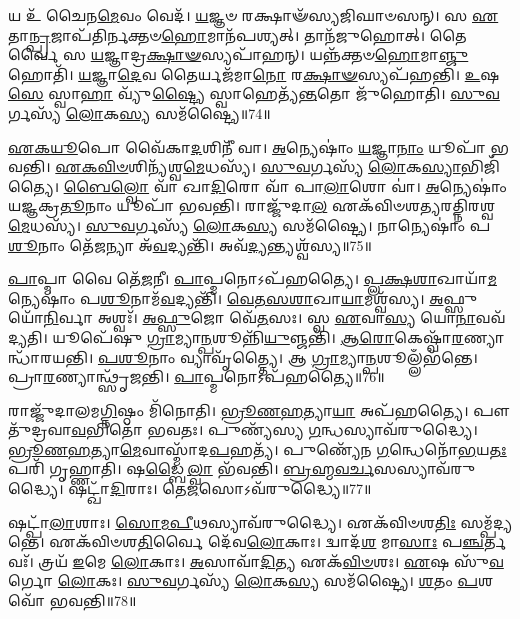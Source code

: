 𑌯 𑌉᳴ 𑌚𑍈𑌨\-\ul{𑌮𑍇}\-𑌵𑌂 𑌵𑍇𑌦᳴।
\-\ul{𑌯}\-𑌜𑍍𑌞𑍞 𑌰𑌕𑍍𑌷𑌾𑍟᳴𑌸𑍍𑌯𑌜𑌿𑌘𑌾𑍞𑌸𑌨𑍍।
𑌸 \ul{𑌏}\-𑌤𑌾\-\ul{𑌨𑍍𑌪𑍍𑌰}\-𑌜𑌾𑌪᳴𑌤𑌿𑌰𑍍𑌨𑌕𑍍𑌤𑍞\-\ul{𑌹𑍋}\-𑌮𑌾𑌨᳴𑌪𑌶𑍍𑌯𑌤𑍍।
𑌤𑌾𑌨᳴𑌜𑍁𑌹𑍋𑌤𑍍।
𑌤𑍈𑌰𑍍𑌵𑍈 𑌸 \ul{𑌯}\-𑌜𑍍𑌞𑌾𑌦𑍍𑌰\-\ul{𑌕𑍍𑌷𑌾}\-\-\ul{𑍟}\-𑌸𑍍𑌯𑌪𑌾᳴𑌹𑌨𑍍।
𑌯𑌨𑍍𑌨᳴𑌕𑍍𑌤𑍞\-\ul{𑌹𑍋}\-𑌮𑌾\-\ul{𑌞𑍍𑌜𑍁}\-𑌹𑍋𑌤𑌿᳴।
\-\ul{𑌯}\-𑌜𑍍𑌞𑌾\-\ul{𑌦𑍇}\-𑌵 𑌤𑍈𑌰𑍍𑌯𑌜᳴𑌮𑌾\-\ul{𑌨𑍋} 𑌰\-\ul{𑌕𑍍𑌷𑌾}\-\-\ul{𑍟}\-𑌸𑍍𑌯𑌪᳴𑌹𑌨𑍍𑌤𑌿।
\-\ul{𑌉}\-𑌷\-\ul{𑌸𑍇} 𑌸𑍍𑌵𑌾\-\ul{𑌹𑌾} 𑌵𑍍𑌯𑍁᳴\-\ul{𑌷𑍍𑌟𑍍𑌯𑍈} 𑌸𑍍𑌵𑌾𑌹𑍇𑌤𑍍𑌯᳴\-\ul{𑌨𑍍𑌤}\-𑌤𑍋 𑌜𑍁᳴𑌹𑍋𑌤𑌿।
\-\ul{𑌸𑍁}\-\-\ul{𑌵}\-𑌰𑍍𑌗𑌸𑍍𑌯᳴ \ul{𑌲𑍋}\-𑌕\-\ul{𑌸𑍍𑌯} 𑌸𑌮᳴𑌷𑍍𑌟𑍍𑌯𑍈॥74॥\anuvakamend[𑌵𑍈 𑌨𑌭𑌾𑍞᳴\-\ul{𑌸𑌿} 𑌸𑍂\-\ul{𑌰𑍍𑌯𑍋} 𑌜𑍍𑌯𑍋\-\ul{𑌤𑌿𑌃} 𑌸𑌨𑍍𑌤᳴\-\ul{𑌤𑍍𑌯𑍈} 𑌸𑌮᳴𑌷𑍍𑌟𑍍𑌯𑍈 \ul{𑌭𑍂}\-𑌤𑌂 𑌯𑌜᳴\-\ul{𑌤𑍇} 𑌨𑌵᳴ 𑌚]

\-\ul{𑌏}\-\-\ul{𑌕}\-\-\ul{𑌯𑍂}\-𑌪𑍋 𑌵𑍈᳴𑌕𑌾\-\ul{𑌦}\-𑌶𑌿𑌨𑍀᳴ 𑌵𑌾।
\-\ul{𑌅}\-𑌨𑍍𑌯𑍇𑌷𑌾𑌂॑ \ul{𑌯}\-𑌜𑍍𑌞𑌾\-\ul{𑌨𑌾𑌂} 𑌯𑍂𑌪𑌾᳴ 𑌭𑌵𑌨𑍍𑌤𑌿।
\-\ul{𑌏}\-\-\ul{𑌕}\-\-\ul{𑌵𑌿}\-\-\ul{𑍞}\-𑌶𑌿𑌨𑍍𑌯᳴𑌶𑍍𑌵\-\ul{𑌮𑍇}\-𑌧𑌸𑍍𑌯᳴।
\-\ul{𑌸𑍁}\-\-\ul{𑌵}\-𑌰𑍍𑌗𑌸𑍍𑌯᳴ \ul{𑌲𑍋}\-𑌕\-\ul{𑌸𑍍𑌯𑌾}\-𑌭𑌿𑌜𑌿᳴𑌤𑍍𑌯𑍈।
\-\ul{𑌬𑍈}\-\-\ul{𑌲𑍍}\-𑌵𑍋 𑌵𑌾᳴ 𑌖𑌾\-\ul{𑌦𑌿}\-𑌰𑍋 𑌵𑌾᳴ 𑌪𑌾\-\ul{𑌲𑌾}\-𑌶𑍋 𑌵𑌾॑।
\-\ul{𑌅}\-𑌨𑍍𑌯𑍇𑌷𑌾𑌂॑ 𑌯𑌜𑍍𑌞𑌕𑍍𑌰\-\ul{𑌤𑍂}\-𑌨𑌾𑌂 𑌯𑍂𑌪𑌾᳴ 𑌭𑌵𑌨𑍍𑌤𑌿।
𑌰𑌾𑌜𑍍𑌜𑍁᳴𑌦𑌾\-\ul{𑌲} 𑌏𑌕᳴𑌵𑌿𑍞𑌶𑌤𑍍𑌯𑌰𑌤𑍍𑌨𑌿𑌰𑌶𑍍𑌵\-\ul{𑌮𑍇}\-𑌧𑌸𑍍𑌯᳴।
\-\ul{𑌸𑍁}\-\-\ul{𑌵}\-𑌰𑍍𑌗𑌸𑍍𑌯᳴ \ul{𑌲𑍋}\-𑌕\-\ul{𑌸𑍍𑌯} 𑌸𑌮᳴𑌷𑍍𑌟𑍍𑌯𑍈।
𑌨𑌾𑌨𑍍𑌯𑍇𑌷𑌾𑌂॑ 𑌪\-\ul{𑌶𑍂}\-𑌨𑌾𑌂 𑌤𑍇᳴\-\ul{𑌜}\-𑌨𑍍𑌯𑌾 𑌅᳴\-\ul{𑌵}\-𑌦𑍍𑌯𑌨𑍍𑌤𑌿᳴।
𑌅𑌵᳴\-\ul{𑌦𑍍𑌯}\-𑌨𑍍𑌤𑍍𑌯𑌶𑍍𑌵᳴𑌸𑍍𑌯॥75॥

\-\ul{𑌪𑌾}\-𑌪𑍍𑌮𑌾 𑌵𑍈 𑌤𑍇᳴\-\ul{𑌜}\-𑌨𑍀।
\-\ul{𑌪𑌾}\-𑌪𑍍𑌮𑌨𑍋\-𑌽𑌪᳴𑌹𑌤𑍍𑌯𑍈।
\-\ul{𑌪𑍍𑌲}\-\-\ul{𑌕𑍍𑌷}\-\-\ul{𑌶𑌾}\-𑌖𑌾𑌯𑌾᳴\-\ul{𑌮}\-𑌨𑍍𑌯𑍇𑌷𑌾𑌂॑ 𑌪\-\ul{𑌶𑍂}\-𑌨𑌾𑌮᳴\-\ul{𑌵}\-𑌦𑍍𑌯𑌨𑍍𑌤𑌿᳴।
\-\ul{𑌵𑍇}\-\-\ul{𑌤}\-\-\ul{𑌸}\-\-\ul{𑌶𑌾}\-𑌖𑌾\-\ul{𑌯𑌾}\-𑌮𑌶𑍍𑌵᳴𑌸𑍍𑌯।
\-\ul{𑌅}\-𑌫𑍍𑌸𑍁𑌯𑍋᳴\-\ul{𑌨𑌿}\-𑌰𑍍𑌵𑌾 𑌅𑌶𑍍𑌵𑌃᳴।
\-\ul{𑌅}\-\-\ul{𑌫𑍍𑌸𑍁}\-𑌜𑍋 𑌵𑍇᳴\-\ul{𑌤}\-𑌸𑌃।
𑌸𑍍𑌵 \ul{𑌏}\-𑌵𑌾\-\ul{𑌸𑍍𑌯} 𑌯𑍋\-\ul{𑌨𑌾}\-𑌵𑌵᳴ 𑌦𑍍𑌯𑌤𑌿।
𑌯𑍂𑌪𑍇᳴𑌷𑍁 \ul{𑌗𑍍𑌰𑌾}\-𑌮𑍍𑌯𑌾\-\ul{𑌨𑍍𑌪}\-𑌶𑍂𑌨𑍍𑌨𑌿᳴\-\ul{𑌯𑍁}\-𑌞𑍍𑌜𑌨𑍍𑌤𑌿᳴।
\-\ul{𑌆}\-\-\ul{𑌰𑍋}\-𑌕𑍇𑌷𑍍𑌵𑌾᳴\-\ul{𑌰}\-𑌣𑍍𑌯𑌾𑌨𑍍𑌧𑌾᳴𑌰𑌯𑌨𑍍𑌤𑌿।
\-\ul{𑌪}\-\-\ul{𑌶𑍂}\-𑌨𑌾𑌂 𑌵𑍍𑌯𑌾𑌵𑍃᳴𑌤𑍍𑌤𑍍𑌯𑍈।
𑌆 \ul{𑌗𑍍𑌰𑌾}\-𑌮𑍍𑌯𑌾\-\ul{𑌨𑍍𑌪}\-𑌶𑍂𑌲𑍍𑌲𑌁𑌭᳴𑌨𑍍𑌤𑍇।
𑌪𑍍𑌰𑌾\-\ul{𑌰}\-𑌣𑍍𑌯𑌾𑌨𑍍𑌥𑍍𑌸𑍃᳴𑌜𑌨𑍍𑌤𑌿।
\-\ul{𑌪𑌾}\-𑌪𑍍𑌮𑌨𑍋\-𑌽𑌪᳴𑌹𑌤𑍍𑌯𑍈॥76॥\anuvakamend[𑌅𑌶𑍍𑌵᳴\-\ul{𑌸𑍍𑌯} 𑌵𑍍𑌯𑌾𑌵𑍃᳴\-\ul{𑌤𑍍𑌤𑍍𑌯𑍈} 𑌤𑍍𑌰𑍀𑌣𑌿᳴ 𑌚]

𑌰𑌾𑌜𑍍𑌜𑍁᳴𑌦𑌾𑌲𑌮\-\ul{𑌗𑍍𑌨𑌿}\-𑌷𑍍𑌠𑌂 𑌮𑌿᳴𑌨𑍋𑌤𑌿।
\-\ul{𑌭𑍍𑌰𑍂}\-\-\ul{𑌣}\-\-\ul{𑌹}\-𑌤𑍍𑌯𑌾\-\ul{𑌯𑌾} 𑌅𑌪᳴𑌹𑌤𑍍𑌯𑍈।
𑌪𑍗𑌤𑍁᳴𑌦𑍍𑌰𑌵𑌾\-\ul{𑌵}\-𑌭𑌿𑌤𑍋᳴ 𑌭𑌵𑌤𑌃।
𑌪𑍁𑌣𑍍𑌯᳴𑌸𑍍𑌯 \ul{𑌗}\-𑌨𑍍𑌧𑌸𑍍𑌯𑌾𑌵᳴𑌰𑍁𑌦𑍍𑌧𑍍𑌯𑍈।
\-\ul{𑌭𑍍𑌰𑍂}\-\-\ul{𑌣}\-\-\ul{𑌹}\-𑌤𑍍𑌯𑌾\-\-\ul{𑌮𑍇}\-𑌵𑌾\-𑌸𑍍𑌮𑌾᳴𑌦\-\ul{𑌪}\-𑌹𑌤𑍍𑌯᳴।
𑌪𑍁𑌣𑍍𑌯𑍇᳴𑌨 \ul{𑌗}\-𑌨𑍍𑌧𑍇𑌨𑍋᳴\-\ul{𑌭}\-𑌯\-\ul{𑌤𑌃} 𑌪𑌰𑌿᳴ 𑌗𑍃𑌹𑍍𑌣𑌾𑌤𑌿।
𑌷\-\ul{𑌡𑍍𑌬𑍈}\-\-\ul{𑌲𑍍}\-𑌵𑌾 𑌭᳴𑌵𑌨𑍍𑌤𑌿।
\-\ul{𑌬𑍍𑌰}\-\-\ul{𑌹𑍍𑌮}\-\-\ul{𑌵}\-\-\ul{𑌰𑍍𑌚}\-𑌸𑌸𑍍𑌯𑌾𑌵᳴𑌰𑍁𑌦𑍍𑌧𑍍𑌯𑍈।
𑌷𑌟𑍍𑌖𑌾᳴\-\ul{𑌦𑌿}\-𑌰𑌾𑌃।
𑌤𑍇\-\ul{𑌜}\-𑌸𑍋\-𑌽𑌵᳴𑌰𑍁𑌦𑍍𑌧𑍍𑌯𑍈॥77॥

𑌷𑌟𑍍𑌪𑌾᳴\-\ul{𑌲𑌾}\-𑌶𑌾𑌃।
\-\ul{𑌸𑍋}\-\-\ul{𑌮}\-\-\ul{𑌪𑍀}\-𑌥𑌸𑍍𑌯𑌾𑌵᳴𑌰𑍁𑌦𑍍𑌧𑍍𑌯𑍈।
𑌏𑌕᳴𑌵𑌿𑍞𑌶\-\ul{𑌤𑌿𑌃} 𑌸𑌮𑍍𑌪᳴𑌦𑍍𑌯𑌨𑍍𑌤𑍇।
𑌏𑌕᳴𑌵𑌿𑍞𑌶\-\ul{𑌤𑌿}\-𑌰𑍍𑌵𑍈 𑌦𑍇᳴𑌵\-\ul{𑌲𑍋}\-𑌕𑌾𑌃।
𑌦𑍍𑌵𑌾𑌦᳴\-\ul{𑌶} 𑌮𑌾\-\ul{𑌸𑌾𑌃} 𑌪\-\ul{𑌞𑍍𑌚}\-𑌰𑍍𑌤𑌵𑌃᳴।
𑌤𑍍𑌰𑌯᳴ \ul{𑌇}\-𑌮𑍇 \ul{𑌲𑍋}\-𑌕𑌾𑌃।
\-\ul{𑌅}\-𑌸𑌾𑌵𑌾᳴\-\ul{𑌦𑌿}\-𑌤𑍍𑌯 𑌏𑌕᳴\-\ul{𑌵𑌿}\-\-\ul{𑍞}\-𑌶𑌃।
\-\ul{𑌏}\-𑌷 𑌸𑍁᳴\-\ul{𑌵}\-𑌰𑍍𑌗𑍋 \ul{𑌲𑍋}\-𑌕𑌃।
\-\ul{𑌸𑍁}\-\-\ul{𑌵}\-𑌰𑍍𑌗𑌸𑍍𑌯᳴ \ul{𑌲𑍋}\-𑌕\-\ul{𑌸𑍍𑌯} 𑌸𑌮᳴𑌷𑍍𑌟𑍍𑌯𑍈।
\-\ul{𑌶}\-𑌤𑌂 \ul{𑌪}\-𑌶𑌵𑍋᳴ 𑌭𑌵𑌨𑍍𑌤𑌿॥78॥

